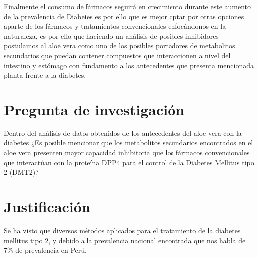 Finalmente el consumo de fármacos seguirá en crecimiento durante este aumento de la prevalencia de Diabetes es por ello que es mejor optar por otras opciones aparte de los fármacos y tratamientos convencionales enfocándonos en la naturaleza, es por ello que haciendo un análisis de posibles inhibidores postulamos al aloe vera como uno de los posibles portadores de metabolitos secundarios que puedan contener compuestos que interaccionen a nivel del intestino y estómago con fundamento a los antecedentes que presenta mencionada planta frente a la diabetes.

\section{Pregunta de investigación}
Dentro del análisis de datos obtenidos de los antecedentes del aloe vera con la diabetes ¿Es posible mencionar que los metabolitos secundarios encontrados en el aloe vera presenten mayor capacidad inhibitoria que los  fármacos convencionales que interactúan con la proteína DPP4 para el control de la Diabetes Mellitus tipo 2 (DMT2)?

\section{Justificación}

Se ha visto que diversos métodos aplicados para el tratamiento de la diabetes mellitus tipo 2, y debido a la prevalencia nacional encontrada que nos habla de 7\% de prevalencia en Perú. %


